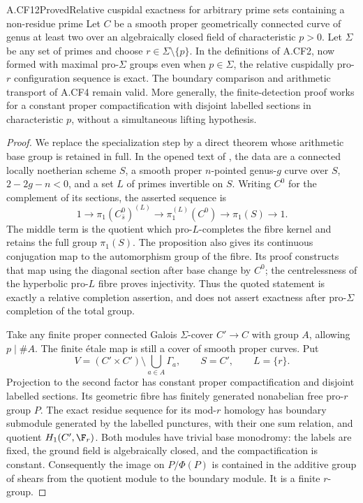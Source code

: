 \begin{claim}{A.CF12}{Proved}{Relative cuspidal exactness for arbitrary prime sets containing a non-residue prime}
Let \(C\) be a smooth proper geometrically connected curve of genus at
least two over an algebraically closed field of characteristic \(p>0\).
Let \(\Sigma\) be any set of primes and choose
\(r\in\Sigma\setminus\{p\}\). In the definitions of A.CF2, now formed
with maximal pro-\(\Sigma\) groups even when \(p\in\Sigma\), the
relative cuspidally pro-\(r\) configuration sequence is exact. The
boundary comparison and arithmetic transport of A.CF4 remain valid.
More generally, the finite-detection proof works for a constant proper
compactification with disjoint labelled sections in characteristic
\(p\), without a simultaneous lifting hypothesis.
\end{claim}
\begin{proof}
We replace the specialization step by a direct theorem whose arithmetic
base group is retained in full. In the opened text of
\citep[Proposition~2.7]{Stix2005}, the data are a connected locally noetherian scheme \(S\),
a smooth proper \(n\)-pointed genus-\(g\) curve over \(S\),
\(2-2g-n<0\), and a set \(L\) of primes invertible on \(S\).
Writing \(C^0\) for the complement of its sections, the asserted
sequence is
\[
 1\longrightarrow \pi_1(C^0_{\bar s})^{(L)}
  \longrightarrow \pi_1^{(L)}(C^0)
  \longrightarrow \pi_1(S)\longrightarrow1.             \tag{A.CF.12}
\]
The middle term is the quotient which pro-\(L\)-completes the fibre
kernel and retains the full group \(\pi_1(S)\). The proposition also
gives its continuous conjugation map to the automorphism group of the
fibre. Its proof constructs that map using the diagonal section after
base change by \(C^0\); the centrelessness of the hyperbolic pro-\(L\)
fibre proves injectivity. Thus the quoted statement is exactly a
relative completion assertion, and does not assert exactness after
pro-\(\Sigma\) completion of the total group.

Take any finite proper connected Galois \(\Sigma\)-cover
\(C'\to C\) with group \(A\), allowing \(p\mid\#A\).
The finite étale map is still a cover of smooth proper curves. Put
\[
 V=(C'\times C')\setminus\bigcup_{a\in A}\Gamma_a,
 \qquad S=C',\qquad L=\{r\}.
\]
Projection to the second factor has constant proper compactification
and disjoint labelled sections. Its geometric fibre has finitely
generated nonabelian free pro-\(r\) group \(P\).
The exact residue sequence for its mod-\(r\) homology has boundary
submodule generated by the labelled punctures, with their one sum
relation, and quotient \(H_1(C',\F_r)\). Both modules have trivial
base monodromy: the labels are fixed, the ground field is algebraically
closed, and the compactification is constant. Consequently the image
on \(P/\Phi(P)\) is contained in the additive group of shears from
the quotient module to the boundary module. It is a finite
\(r\)-group.


\end{proof}

